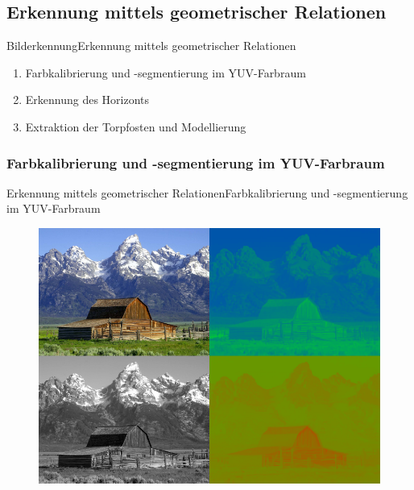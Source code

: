 \documentclass{beamer}
\begin{document}
\subsection{Erkennung mittels geometrischer Relationen}
\begin{frame}{Bilderkennung}{Erkennung mittels geometrischer Relationen}
\begin{enumerate}
    \item Farbkalibrierung und -segmentierung im YUV-Farbraum
    \item Erkennung des Horizonts
    \item Extraktion der Torpfosten und Modellierung
\end{enumerate}
\end{frame}

\subsubsection{Farbkalibrierung und -segmentierung im YUV-Farbraum}
\begin{frame}{Erkennung mittels geometrischer Relationen}{Farbkalibrierung und -segmentierung im YUV-Farbraum}
\begin{figure}[htp]
\centering
\includegraphics[scale=0.3]{Barn-yuv.png}
\end{figure}
\end{frame}
\end{document}
